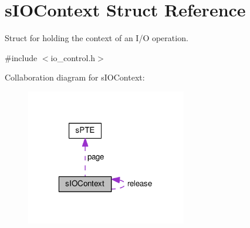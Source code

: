 \hypertarget{structsIOContext}{\section{s\-I\-O\-Context \-Struct \-Reference}
\label{de/d05/structsIOContext}
}


\-Struct for holding the context of an \-I/\-O operation.  




{\ttfamily \#include $<$io\-\_\-control.\-h$>$}



\-Collaboration diagram for s\-I\-O\-Context\-:\nopagebreak
\begin{figure}[H]
\begin{center}
\leavevmode
\includegraphics[width=199pt]{da/d83/structsIOContext__coll__graph}
\end{center}
\end{figure}
